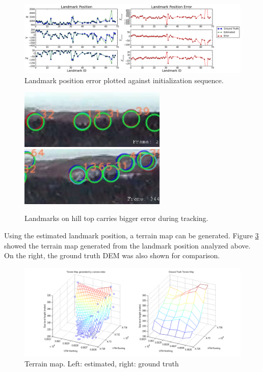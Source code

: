 \begin{figure}[h]
\centering
\includegraphics[width=16cm, keepaspectratio=true]
{./Figures/fltfig/cut1/Figure60.png}
\caption{Landmark position error plotted against initialization sequence. }
\label{fltfig:9}
\end{figure}

\begin{figure}[h]
\centering
\includegraphics[width=7cm, keepaspectratio=true]
{./Figures/fltfig/landmark_13_31_32.jpg}
\includegraphics[width=7cm, keepaspectratio=true]
{./Figures/fltfig/landmark_13_65_32.jpg}
\caption{Landmarks on hill top carries bigger error during tracking.}
\label{fltfig:line_features}
\end{figure}

Using the estimated landmark position, a terrain map can be generated.
Figure \ref{fltfig:10} showed the terrain map generated from the
landmark position analyzed above. On the right, the ground truth DEM was
also shown for comparison. 

\begin{figure}[h]
\centering
\includegraphics[width=14cm, keepaspectratio=true]
{./Figures/fltfig/cut1/terrain/terrain_map_cmp.png}
\caption{Terrain map. Left: estimated, right: ground truth }
\label{fltfig:10}
\end{figure}
\FloatBarrier

